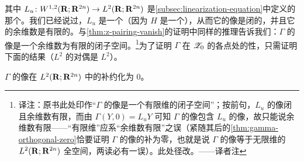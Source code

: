 其中 $L_{u}\colon W^{1,2}(\mathbf{R};\mathbf{R}^{2n})\to L^{2}(\mathbf{R};\mathbf{R}^{2n})$ 是\cref{subsec:linearization-equation}中定义的那个\trLinearOperator。我们已经说过，$L_{u}$ 是一个\trFredholmOperator{}（因为 $H$ 是一个\trMorseFunction），从而它的像是闭的，并且它的余维数是有限的。与\cref{thm:z-pairing-vanish}的证明中同样的推理告诉我们：$\Gamma$ 的像是一个余维数为有限的闭子空间。\footnote{译注：原书此处印作“$\Gamma$ 的像是一个有限维的闭子空间”；按前句，$L_{u}$ 的像闭且余维数有限，而由 $\Gamma(Y,0)=L_{u}Y$ 可知 $\Gamma$ 的像包含 $L_{u}$ 的像，故只能说余维数有限——“有限维”应系“余维数有限”之误（紧随其后的\cref{thm:gamma-orthogonal-zero}恰要证明 $\Gamma$ 的像的\trOrthogonal{}补为零，也就是说 $\Gamma$ 的像等于无限维的 $L^{2}(\mathbf{R};\mathbf{R}^{2n})$ 全空间，两读必有一误）。此处径改。——译者注}为了证明 $\Gamma$ 在 $\mathscr{Z}_{0}$ 的各点处的\trSurjective{}性，只需证明下面的结果（$L^{2}$ 的对偶是 $L^{2}$）。

\begin{lemma}\label{thm:gamma-orthogonal-zero}
$\Gamma$ 的像在 $L^{2}(\mathbf{R};\mathbf{R}^{2n})$ 中的\trOrthogonal{}补约化为 $0$。
\end{lemma}

